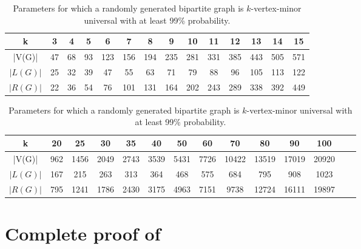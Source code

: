 \documentclass[a4paper,UKenglish,cleveref, autoref, thm-restate]{arxiv}
\begin{document}
\begin{table}[ht]
    \centering
    \caption{Parameters for which a randomly generated bipartite graph is $k$-vertex-minor universal with at least 99\% probability. }
    \begin{tabular}{|c|c|c|c|c|c|c|c|c|c|c|c|c|c|}
        \hline
        k               & 3  & 4  & 5  & 6  & 7  & 8  & 9  & 10  & 11  & 12  & 13  & 14  & 15  \\
        \hline
        |V(G)|  & 47  & 68  & 93  & 123  & 156  & 194  & 235  & 281  & 331  & 385  & 443  & 505  & 571 \\
        \hline
        $|L(G)|$  & 25  & 32  & 39  & 47  & 55  & 63  & 71  & 79  & 88  & 96  & 105  & 113  & 122 \\
        \hline
        $|R(G)|$ & 22  & 36  & 54  & 76  & 101  & 131  & 164  & 202  & 243  & 289  & 338  & 392  & 449 \\
        \hline
    \end{tabular}

    \bigskip

    \begin{tabular}{|c|c|c|c|c|c|c|c|c|c|c|c|c|c|}
        \hline
        k    & 20  & 25  & 30  & 35  & 40  & 50  & 60  & 70  & 80  & 90  & 100 \\
        \hline
        |V(G)|  & 962  & 1456  & 2049  & 2743  & 3539  & 5431  & 7726  & 10422  & 13519  & 17019  & 20920 \\
        \hline
        $|L(G)|$  & 167  & 215  & 263  & 313  & 364  & 468  & 575  & 684  & 795  & 908  & 1023 \\
        \hline
        $|R(G)|$  & 795  & 1241  & 1786  & 2430  & 3175  & 4963  & 7151  & 9738  & 12724  & 16111  & 19897 \\
        \hline
    \end{tabular}

    \label{tab:exists_kvmu99}

\end{table}

\section{Complete proof of  }
    \label{proof:bipartite-vmu}
    \firstbipartitevmu*
    
\end{document}
